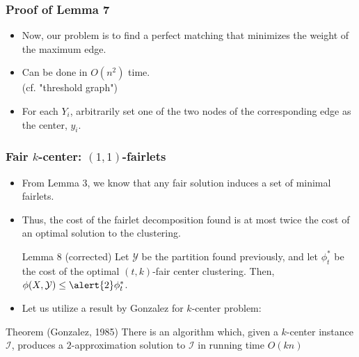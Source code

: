\documentclass{beamer}
\begin{document}


\begin{frame}
\frametitle{Proof of Lemma 7}

\begin{itemize}
	\item Now, our problem is to find a perfect matching that minimizes the weight of the maximum edge.
	
	\item Can be done in $O(n^2)$ time.\\
	(cf. "threshold graph")	
	
	\item For each $Y_i$, arbitrarily set one of the two nodes of the corresponding edge as the center, $y_i$.
\end{itemize}

\end{frame}



\begin{frame}
\frametitle{Fair $k$-center: $(1, 1)$-fairlets}

\begin{itemize}
	\item From Lemma 3, we know that any fair solution induces a set of minimal fairlets. \pause
	
	\item Thus, the cost of the fairlet decomposition found is at most twice the cost of an optimal solution to the clustering.
	
	\begin{block}{Lemma 8 (corrected)}
	Let $\mathcal{Y}$ be the partition found previously, and let $\phi_t^*$ be the cost of the optimal $(t, k)$-fair center clustering. Then, $\phi(X, \mathcal{Y}) \leq \alert{2} \phi_t^*$.

	\end{block} \pause
	
	\item Let us utilize a result by Gonzalez for $k$-center problem:
\end{itemize}

\begin{block}{Theorem (Gonzalez, 1985)}
There is an algorithm which, given a $k$-center instance $\mathcal{I}$, produces a $2$-approximation solution to $\mathcal{I}$ in running time $O(kn)$

\end{block}

\end{frame}
\end{document}
